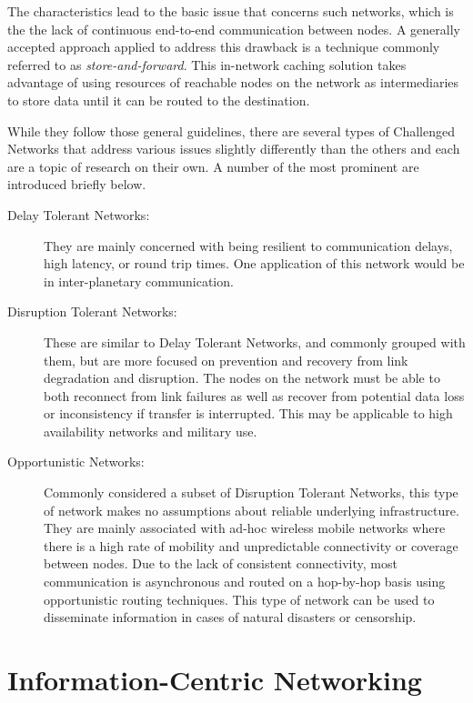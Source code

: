 \documentclass[a4paper,12pt]{report}      %
\begin{document}
The characteristics lead to the basic issue that concerns such networks, which is the the lack of
continuous end-to-end communication between nodes. A generally accepted approach applied to
address this drawback is a technique commonly referred to as \emph{store-and-forward}. This in-network caching solution takes advantage of using resources of reachable nodes on the network as intermediaries to store data until it can be routed to the destination.

While they follow those general guidelines, there are several types of Challenged Networks that
address various issues slightly differently than the others and each are a topic of research on their own.
A number of the most prominent are introduced briefly below.

\begin{description}
\item[Delay Tolerant Networks:] They are mainly concerned with being resilient to communication delays, high
latency, or round trip times. One application of this network would be in inter-planetary
communication\cite{DTNarch}\cite{rfc4838}. 

\item[Disruption Tolerant Networks:] These are similar to Delay Tolerant Networks, and commonly grouped
with them, but are more focused on prevention and recovery from link degradation and disruption. The
nodes on the network must be able to both reconnect from link failures as well as recover from
potential data loss or inconsistency if transfer is interrupted. This may be applicable to high availability
networks and military use\cite{DTNarch}.

\item[Opportunistic Networks:] Commonly considered a subset of Disruption Tolerant Networks, this type of
network makes no assumptions about reliable underlying infrastructure. They are mainly associated
with ad-hoc wireless mobile networks where there is a high rate of mobility and unpredictable
connectivity or coverage between nodes. Due to the lack of consistent connectivity, most
communication is asynchronous and routed on a hop-by-hop basis using opportunistic routing
techniques. This type of network can be used to disseminate information in cases of natural disasters or
censorship\cite{oppnets}.
\end{description}

\section{Information-Centric Networking}
\end{document}
